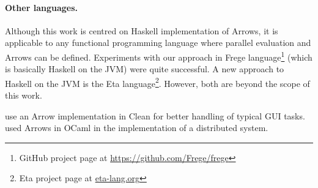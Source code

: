 \paragraph{Other languages.}
Although this work is centred on Haskell implementation of Arrows, it is applicable to any functional programming language where parallel evaluation and Arrows can be defined. Experiments with our approach in Frege language\footnote{GitHub project page at \url{https://github.com/Frege/frege}} (which is basically Haskell on the JVM) were quite successful. A new approach to Haskell on the JVM is the Eta language\footnote{Eta project page at \url{eta-lang.org}}. However, both are beyond the scope of this work.

\citet{achten2004arrows,achten2007arrow} use an Arrow implementation in Clean for better handling of typical GUI tasks. \citet{Dagand:2009:ORD:1481861.1481870} used Arrows in OCaml in the implementation of a distributed system.


